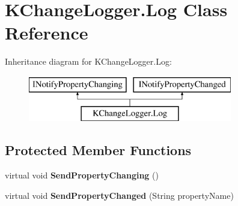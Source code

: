 \hypertarget{class_k_change_logger_1_1_log}{\section{K\-Change\-Logger.\-Log Class Reference}
\label{class_k_change_logger_1_1_log}
}
Inheritance diagram for K\-Change\-Logger.\-Log\-:\begin{figure}[H]
\begin{center}
\leavevmode
\includegraphics[height=2.000000cm]{class_k_change_logger_1_1_log}
\end{center}
\end{figure}
\subsection*{Protected Member Functions}
\begin{DoxyCompactItemize}
\item 
\hypertarget{class_k_change_logger_1_1_log_a13eb7a518e55c6aaeeb02462de77c8a1}{virtual void {\bfseries Send\-Property\-Changing} ()}\label{class_k_change_logger_1_1_log_a13eb7a518e55c6aaeeb02462de77c8a1}

\item 
\hypertarget{class_k_change_logger_1_1_log_a3fef831aed533da1d104dce8f67d3701}{virtual void {\bfseries Send\-Property\-Changed} (String property\-Name)}\label{class_k_change_logger_1_1_log_a3fef831aed533da1d104dce8f67d3701}

\end{DoxyCompactItemize}
